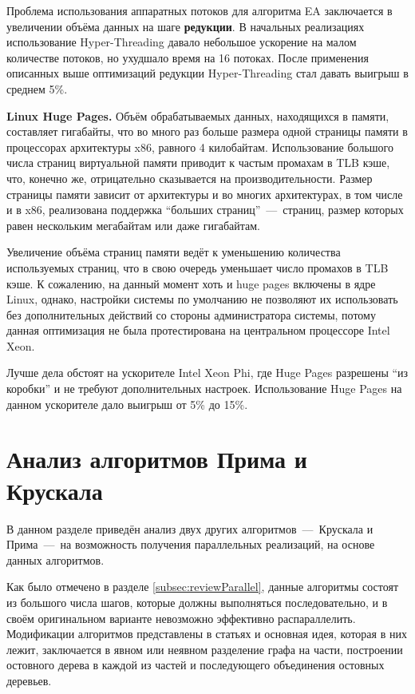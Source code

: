 \documentclass[a4paper,12pt]{extarticle}
\let\stdsection\section
\renewcommand\section{
    \newpage
    \stdsection
}
\begin{document}
Проблема использования аппаратных потоков для алгоритма EA заключается в увеличении объёма данных на шаге \textbf{редукции}. В начальных реализациях использование Hyper-Threading давало небольшое
ускорение на малом количестве потоков, но ухудшало время на 16 потоках. После применения описанных выше оптимизаций редукции Hyper-Threading стал давать выигрыш в среднем 5\%.



\textbf{Linux Huge Pages.}
Объём обрабатываемых данных, находящихся в памяти, составляет гигабайты, что во много раз больше размера одной страницы памяти в процессорах архитектуры x86, равного 4 килобайтам. Использование большого числа страниц виртуальной памяти приводит к частым промахам в TLB кэше, что, конечно же, отрицательно сказывается на производительности.
Размер страницы памяти зависит от архитектуры и во многих архитектурах, в том числе и в x86, реализована поддержка ``больших страниц''~---~страниц, размер которых равен нескольким мегабайтам или даже гигабайтам.

Увеличение объёма страниц памяти ведёт к уменьшению количества используемых страниц, что в свою очередь уменьшает число промахов в TLB кэше.
К сожалению, на данный момент хоть и huge pages включены в ядре Linux, однако, настройки системы по умолчанию не позволяют их использовать без дополнительных действий со стороны администратора системы, потому данная оптимизация не была протестирована на центральном процессоре Intel Xeon.

Лучше дела обстоят на ускорителе Intel Xeon Phi, где Huge Pages разрешены ``из коробки'' и не требуют дополнительных настроек. Использование Huge Pages на данном ускорителе дало выигрыш от 5\% до 15\%.



\section{Анализ алгоритмов Прима и Крускала}
\label{sec:algoOther}

В данном разделе приведён анализ двух других алгоритмов~---~Крускала и Прима~---~на возможность получения параллельных реализаций, на основе данных алгоритмов.

Как было отмечено в разделе \ref{subsec:reviewParallel}, данные алгоритмы состоят из большого числа шагов, которые должны выполняться последовательно, и в своём оригинальном варианте невозможно эффективно распараллелить.
Модификации алгоритмов представлены в статьях \cite{boruvka-prima, kruskal-parallel} и основная идея, которая в них лежит, заключается в явном или неявном разделение графа на части, построении остовного дерева в каждой из частей и последующего объединения остовных деревьев.
\end{document}
